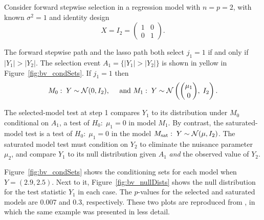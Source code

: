 \documentclass{article}
\begin{document}
\begin{example}\label{ex:bivariate}
  Consider forward stepwise selection in a regression model with $n=p=2$, with known $\sigma^2=1$ and identity design 
\[
X = I_2=\begin{pmatrix} 1 & 0 \\ 0 & 1\end{pmatrix}.
\] 

The forward stepwise path and the lasso path both select $j_1=1$ if and only if $|Y_1|>|Y_2|$. The selection event $A_1=\{|Y_1| > |Y_2|\}$ is shown in yellow in Figure~\ref{fig:bv_condSets}. If $j_1=1$ then
\[
M_0:\; Y\sim \mathcal{N}(0,I_2), \quad\text{ and } 
M_1:\; Y \sim \mathcal{N}\left(\binom{\mu_1}{0}, \; I_2\right).
\]

The selected-model test at step 1 compares $Y_1$ to its distribution under $M_0$ conditional on $A_1$, a test of $H_0:\;\mu_1=0$ in model $M_1$. By contrast, the saturated-model test is a test of $H_0:\; \mu_1=0$ in the model $M_{\text{sat}}:\; Y \sim \mathcal{N}(\mu, I_2)$. The saturated model test must condition on $Y_2$ to eliminate the nuisance parameter $\mu_2$, and compare $Y_1$ to its null distribution given $A_1$ {\em and} the observed value of $Y_2$.

Figure~\ref{fig:bv_condSets} shows the conditioning sets for each model when $Y=(2.9, 2.5)$. Next to it, Figure~\ref{fig:bv_nullDists} shows the null distribution for the test statistic $Y_1$ in each case. The $p$-values for the selected and saturated models are 0.007 and 0.3, respectively. These two plots are reproduced from \citet{fithian2014optimal}, in which the same example was presented in less detail.
\end{example}
\end{document}
